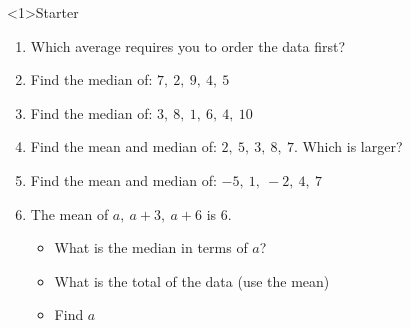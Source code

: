 \documentclass{beamer}
\newcommand{\ashow}[1]{\uncover<2->{\textcolor{red}{\small #1}}}
\newcommand{\ashowq}[1]{\alt<2->{\textcolor{red}{\small #1}}{?}}
\begin{document}
\begin{frame}<1>{Starter}
\vspace{-0.8em}

\footnotesize
\begin{enumerate}\itemsep2pt
  \item Which average requires you to order the data first? \ashow{Median}
  \item Find the median of: $7,\ 2,\ 9,\ 4,\ 5$ \ashow{$=5$}
  \item Find the median of: $3,\ 8,\ 1,\ 6,\ 4,\ 10$ \ashow{$=5$}
  \item Find the mean and median of: $2,\ 5,\ 3,\ 8,\ 7$.  
        Which is larger? \ashow{Mean $=5$, median $=5$ (equal).}
  \item Find the mean and median of: $-5,\ 1,\ -2,\ 4,\ 7$ \ashow{Mean $=1$, median $=1$.}
  \item The mean of $a,\ a+3,\ a+6$ is $6$.
        \begin{itemize}\footnotesize
        \item What is the median in terms of $a$? \ashow{$a+3$}
          \item What is the total of the data (use the mean) \ashow{$18$}
          \item Find $a$ \ashow{$a=3$}
        \end{itemize}
\end{enumerate}

\end{frame}
\end{document}
